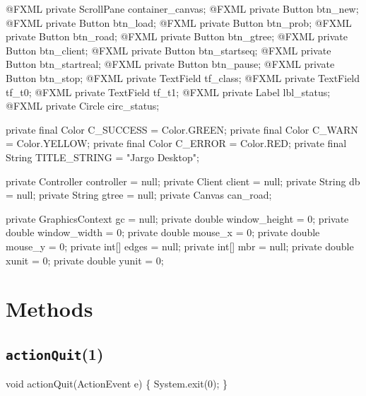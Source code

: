 \nwenddocs{}\plusendmoddef
@FXML private ScrollPane container_canvas;
@FXML private Button btn_new;
@FXML private Button btn_load;
@FXML private Button btn_prob;
@FXML private Button btn_road;
@FXML private Button btn_gtree;
@FXML private Button btn_client;
@FXML private Button btn_startseq;
@FXML private Button btn_startreal;
@FXML private Button btn_pause;
@FXML private Button btn_stop;
@FXML private TextField tf_class;
@FXML private TextField tf_t0;
@FXML private TextField tf_t1;
@FXML private Label lbl_status;
@FXML private Circle circ_status;
\nwendcode{}\nwdocspar

\nwenddocs{}\plusendmoddef
private final Color C_SUCCESS = Color.GREEN;
private final Color C_WARN = Color.YELLOW;
private final Color C_ERROR = Color.RED;
private final String TITLE_STRING = "Jargo Desktop";
\nwendcode{}\nwdocspar

\nwenddocs{}\plusendmoddef
private Controller controller = null;
private Client client = null;
private String db = null;
private String gtree = null;
private Canvas can_road;
\nwendcode{}\nwdocspar

\nwenddocs{}\plusendmoddef
private GraphicsContext gc = null;
private double window_height = 0;
private double window_width = 0;
private double mouse_x = 0;
private double mouse_y = 0;
private int[] edges = null;
private int[] mbr = null;
private double xunit = 0;
private double yunit = 0;
\nwendcode{}\nwdocspar

\section{Methods}

\subsection{\texttt{actionQuit}(1)}
\nwenddocs{}\endmoddef{}
void actionQuit(ActionEvent e) \{
  System.exit(0);
\}
\eatline
{}\nwendcode{}\nwdocspar
